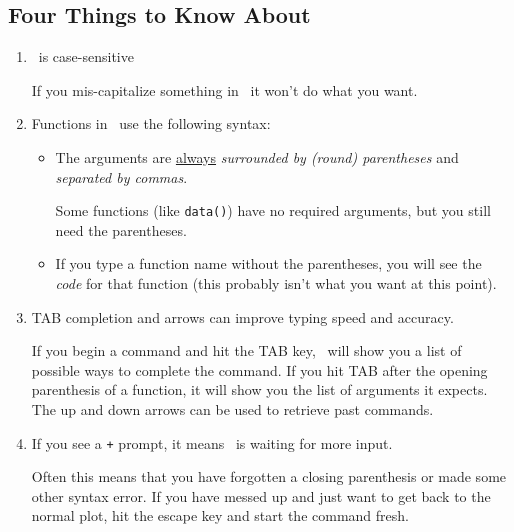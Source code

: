 \subsection*{Four Things to Know About \R}
\begin{enumerate}
\Rwidth=6.25in
\item \R\ is case-sensitive

If you mis-capitalize something in \R\ it won't do what you want.

\item 
Functions in \R\ use the following syntax:
\begin{knitrout}
\end{knitrout}

\vspace{-5mm}
%
\begin{itemize}
\item The arguments are \underline{always} \emph{surrounded by (round) parentheses} and 
\emph{separated by commas}.

Some functions (like \verb!data()!) 
have no required arguments, but you still need the parentheses.

\item
If you type a function name without the parentheses, you will see the \emph{code} for that
function (this probably isn't what you want at this point).
\end{itemize}
\item
TAB completion and arrows can improve typing speed and accuracy.

If you begin a command and hit the TAB key, \R\ will show you a list of possible ways to 
complete the command.  If you hit TAB after the opening parenthesis of a function, it will show you
the list of arguments it expects.  The up and down arrows can be used to retrieve past commands.
\item
If you see a \verb!+! prompt, it means \R\ is waiting for more input.

%
Often this means that you have forgotten a closing parenthesis or made some other
syntax error.  If you have messed up and just want to get back to the normal plot,
hit the escape key and start the command fresh.
\end{enumerate}

